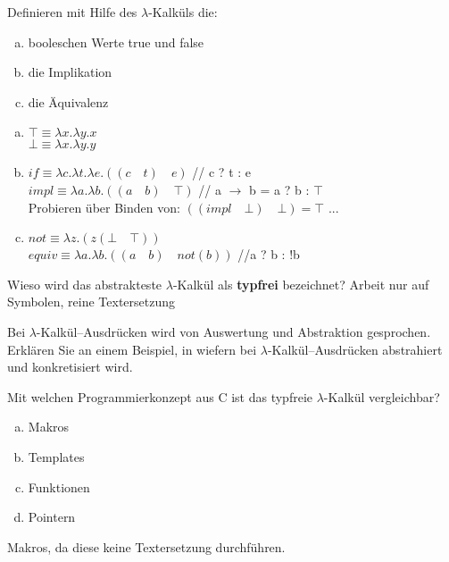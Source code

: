 \begin{card}
	Definieren mit Hilfe des $\lambda$-Kalküls die:
	\begin{enumerate}[a)]
	\item booleschen Werte true und false
	\item die Implikation
	\item die Äquivalenz 
	\end{enumerate}
	\hr
	\begin{enumerate}[a)]
	\item 	$\top \equiv \lambda x.\lambda y . x$\\
			$\bot \equiv \lambda x.\lambda y . y$
	\item 	$if \equiv \lambda c.\lambda t.\lambda e.((c \quad t) \quad e)$ // c ? t : e\\
			$impl \equiv \lambda a.\lambda b.((a \quad b) \quad \top)$ // a $\rightarrow$ b = a ? b : $\top$\\
			Probieren über Binden von: $((impl \quad \bot) \quad \bot) = \top$ ...
	\item	$not \equiv \lambda z.(z (\bot \quad \top))$\\
			$equiv \equiv  \lambda a.\lambda b.((a \quad b) \quad not(b))$ //a ? b : !b
	\end{enumerate}
\end{card}

\begin{card}
	Wieso wird das abstrakteste $\lambda$-Kalkül als \textbf{typfrei} bezeichnet?
	\hr
	Arbeit nur auf Symbolen, reine Textersetzung
\end{card}

\begin{card}
	Bei $\lambda$-Kalkül–Ausdrücken wird von Auswertung und Abstraktion gesprochen. Erklären Sie an einem Beispiel, in wiefern bei $\lambda$-Kalkül–Ausdrücken abstrahiert und	konkretisiert wird.
	\hr
\end{card}

\begin{card}
	Mit welchen Programmierkonzept aus C ist das typfreie $\lambda$-Kalkül vergleichbar? 
	\begin{enumerate}[a)]
	\item Makros
	\item Templates
	\item Funktionen
	\item Pointern
	\end{enumerate}
	\hr
	Makros, da diese keine Textersetzung durchführen.
\end{card}

